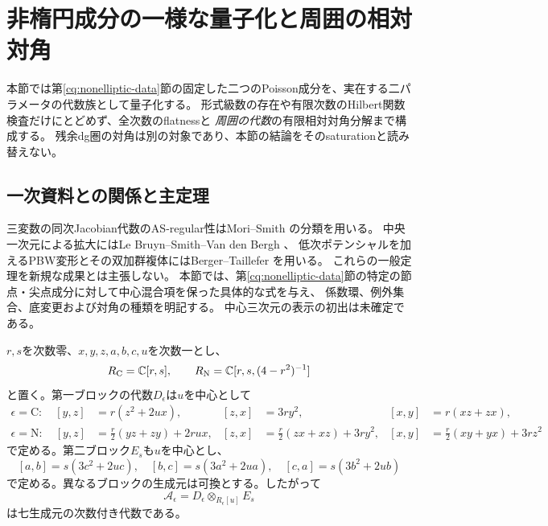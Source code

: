 \section{非楕円成分の一様な量子化と周囲の相対対角}
\label{nq:sec:quantization}
本節では第\ref{cq:nonelliptic-data}節の固定した二つのPoisson成分を、実在する二パラメータの代数族として量子化する。
形式級数の存在や有限次数のHilbert関数検査だけにとどめず、全次数のflatnessと
\emph{周囲の代数}の有限相対対角分解まで構成する。
残余dg圏の対角は別の対象であり、本節の結論をそのsaturationと読み替えない。

\subsection{一次資料との関係と主定理}
三変数の同次Jacobian代数のAS-regular性はMori--Smith
\cite[Theorem 4.2, Lemma 4.1]{PMoriSmith}の分類を用いる。
中央一次元による拡大にはLe Bruyn--Smith--Van den Bergh
\cite[Theorem 2.6, Corollary 2.7, Theorem 3.1.3]{LBSVNE12}、
低次ポテンシャルを加えるPBW変形とその双加群複体にはBerger--Taillefer
\cite[Theorems 3.1 and 3.6]{PBergerTaillefer}を用いる。
これらの一般定理を新規な成果とは主張しない。
本節では、第\ref{cq:nonelliptic-data}節の特定の節点・尖点成分に対して中心混合項を保った具体的な式を与え、
係数環、例外集合、底変更および対角の種類を明記する。
中心三次元の表示の初出は未確定である。

$r,s$を次数零、$x,y,z,a,b,c,u$を次数一とし、
\begin{equation}
 R_{\mathrm C}=\mathbb C[r,s],\qquad
 R_{\mathrm N}=\mathbb C[r,s,(4-r^2)^{-1}]
\end{equation}
と置く。第一ブロックの代数$D_\epsilon$は$u$を中心として
\begin{align}
 \epsilon=\mathrm C:\quad
 [y,z]&=r(z^2+2ux),&[z,x]&=3ry^2,&[x,y]&=r(xz+zx),
 \label{nq:eq:cusp}\\
 \epsilon=\mathrm N:\quad
 [y,z]&=\tfrac r2(yz+zy)+2rux,&
 [z,x]&=\tfrac r2(zx+xz)+3ry^2,&
 [x,y]&=\tfrac r2(xy+yx)+3rz^2
 \label{nq:eq:node}
\end{align}
で定める。第二ブロック$E_s$も$u$を中心とし、
\begin{equation}\label{nq:eq:fermat}
 [a,b]=s(3c^2+2uc),\quad
 [b,c]=s(3a^2+2ua),\quad
 [c,a]=s(3b^2+2ub)
\end{equation}
で定める。異なるブロックの生成元は可換とする。したがって
\begin{equation}
 \mathcal A_\epsilon=D_\epsilon\otimes_{R_\epsilon[u]}E_s
\end{equation}
は七生成元の次数付き代数である。

